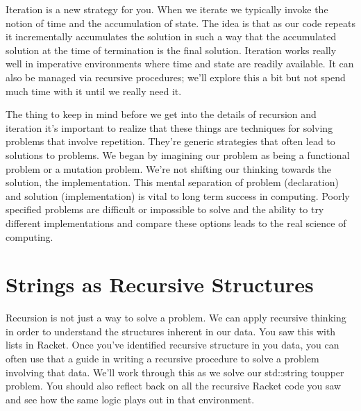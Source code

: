 \documentclass[]{tufte-handout}
\begin{document}
Iteration is a new strategy for you. When we iterate we typically invoke the notion of time and the accumulation of state. The idea is that as our code repeats it incrementally accumulates the solution in such a way that the accumulated solution at the time of termination is the final solution.  Iteration works really well in imperative environments where time and state are readily available. It can also be managed via recursive procedures; we'll explore this a bit but not spend much time with it until we really need it.

The thing to keep in mind before we get into the details of recursion and iteration it's important to realize that these things are techniques for solving problems that involve repetition. They're generic strategies that often lead to solutions to problems.  We began by imagining our problem as being a functional problem or a mutation problem. We're not shifting our thinking towards the solution, the implementation. This mental separation of problem (declaration) and solution (implementation) is vital to long term success in computing. Poorly specified problems are difficult or impossible to solve and the ability to try different implementations and compare these options leads to the real science of computing. 
 
\section{Strings as Recursive Structures}

Recursion is not just a way to solve a problem. We can apply recursive thinking in order to understand the structures inherent in our data. You saw this with lists in Racket.  Once you've identified recursive structure in you data, you can often use that a guide in writing a recursive procedure to solve a problem involving that data. We'll work through this as we solve our std::string toupper problem. You should also reflect back on all the recursive Racket code you saw and see how the same logic plays out in that environment.
\end{document}
